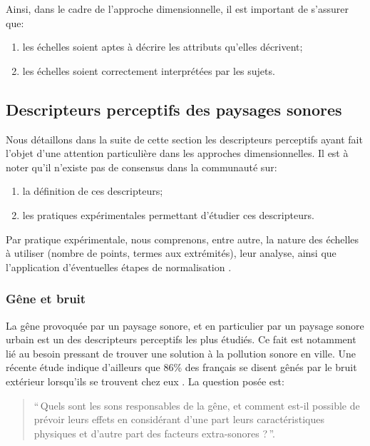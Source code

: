Ainsi, dans le cadre de l'approche dimensionnelle, il est important de s'assurer que:

\begin{enumerate}
\item les échelles soient aptes à décrire les attributs qu'elles décrivent;
\item les échelles soient correctement interprétées par les sujets.
\end{enumerate}

\subsection{Descripteurs perceptifs des paysages sonores}
\label{sec:descripteursPercetifs}

Nous détaillons dans la suite de cette section les descripteurs perceptifs ayant fait l'objet d'une attention particulière dans les approches dimensionnelles. Il est à noter qu'il n'existe pas de consensus dans la communauté sur:

\begin{enumerate}
\item la définition de ces descripteurs; 
\item les pratiques expérimentales permettant d'étudier ces descripteurs.
\end{enumerate}

Par pratique expérimentale, nous comprenons, entre autre, la nature des échelles à utiliser (nombre de points, termes aux extrémités), leur analyse, ainsi que l'application d'éventuelles étapes de normalisation \citep{aletta2016soundscape}.

\subsubsection{Gêne et bruit}

La gêne provoquée par un paysage sonore, et en particulier par un paysage sonore urbain est un des descripteurs perceptifs les plus étudiés. Ce fait est notamment lié au besoin pressant de trouver une solution à la pollution sonore en ville. Une récente étude indique d'ailleurs que 86\% des français se disent gênés par le bruit extérieur lorsqu'ils se trouvent chez eux \citep{noiseFrench}. La question posée est: \\

\begin{quote}
``\,Quels sont les sons responsables de la gêne, et comment est-il possible de prévoir leurs effets en considérant d'une part leurs caractéristiques physiques et d'autre part des facteurs extra-sonores ?\,''.
\end{quote}

